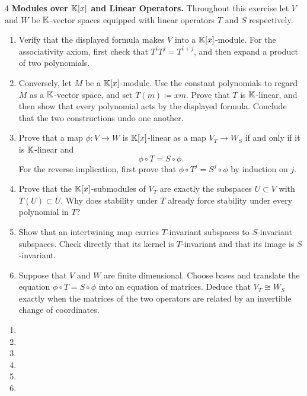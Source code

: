\documentclass[Notebook.tex]{subfiles}
\begin{document}
\begin{problem}{4}\label{m:dictionary}
	\textbf{Modules over $\mathbb K[x]$ and Linear Operators.} Throughout this exercise let $V$ and $W$ be $\mathbb K$-vector spaces equipped with linear operators $T$ and $S$ respectively.
	\begin{enumerate}[label=(\alph*),ref=\theenumi\alph*]
		\item Verify that the displayed formula makes $V$ into a $\mathbb K[x]$-module. For the associativity axiom, first check that $T^iT^j=T^{i+j}$, and then expand a product of two polynomials.
		\item Conversely, let $M$ be a $\mathbb K[x]$-module. Use the constant polynomials to regard $M$ as a $\mathbb K$-vector space, and set $T(m)\coloneqq xm$. Prove that $T$ is $\mathbb K$-linear, and then show that every polynomial acts by the displayed formula. Conclude that the two constructions undo one another.
		\item Prove that a map $\phi:V\to W$ is $\mathbb K[x]$-linear as a map $V_T\to W_S$ if and only if it is $\mathbb K$-linear and
		\[
		\phi\circ T=S\circ \phi.
		\]
		For the reverse implication, first prove that $\phi\circ T^j=S^j\circ\phi$ by induction on $j$.
		\item Prove that the $\mathbb K[x]$-submodules of $V_T$ are exactly the subspaces $U\subset V$ with $T(U)\subset U$. Why does stability under $T$ already force stability under every polynomial in $T$?
		\item Show that an intertwining map carries $T$-invariant subspaces to $S$-invariant subspaces. Check directly that its kernel is $T$-invariant and that its image is $S$-invariant.
		\item Suppose that $V$ and $W$ are finite dimensional. Choose bases and translate the equation $\phi\circ T=S\circ\phi$ into an equation of matrices. Deduce that $V_T\cong W_S$ exactly when the matrices of the two operators are related by an invertible change of coordinates.
	\end{enumerate}
\end{problem}

\begin{solution}
	\bbni
	\begin{enumerate}[label=(\alph*),ref=\theenumi\alph*]
		\item
		\item
		\item
		\item
		\item
		\item
	\end{enumerate}
\end{solution}
\end{document}
